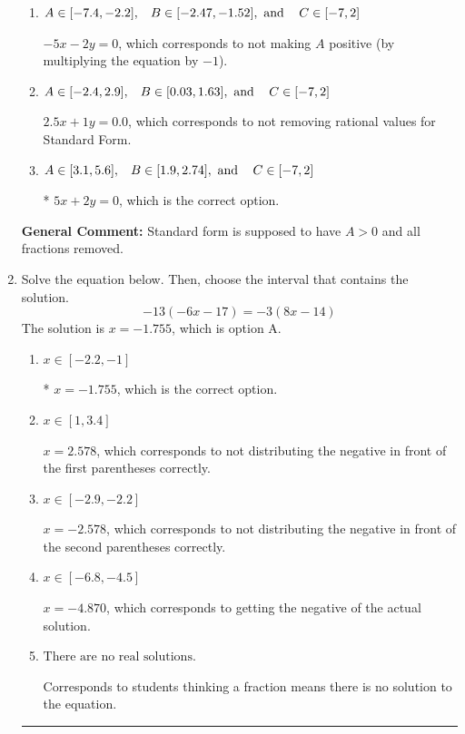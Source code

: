 \documentclass{extbook}[14pt]
\newcommand{\litem}[1]{\item #1

\rule{\textwidth}{0.4pt}}
\begin{document}
\begin{enumerate}
{\begin{enumerate}[label=\Alph*.]
 $5x - 2y = 0$, which corresponds to using the opposite (negative) slope of the graph, but did everything else correctly.
\item \( A \in [-7.4, -2.2], \hspace{3mm} B \in [-2.47, -1.52], \text{ and } \hspace{3mm} C \in [-7, 2] \)

 $-5x - 2y = 0$, which corresponds to not making $A$ positive (by multiplying the equation by $-1$).
\item \( A \in [-2.4, 2.9], \hspace{3mm} B \in [0.03, 1.63], \text{ and } \hspace{3mm} C \in [-7, 2] \)

 $2.5x + 1y = 0.0$, which corresponds to not removing rational values for Standard Form.
\item \( A \in [3.1, 5.6], \hspace{3mm} B \in [1.9, 2.74], \text{ and } \hspace{3mm} C \in [-7, 2] \)

* $5x + 2y = 0$, which is the correct option.
\end{enumerate}

\textbf{General Comment:} Standard form is supposed to have $A > 0$ and all fractions removed.
}
\litem{
Solve the equation below. Then, choose the interval that contains the solution.
\[ -13(-6x -17) = -3(8x -14) \]The solution is \( x = -1.755 \), which is option A.\begin{enumerate}[label=\Alph*.]
\item \( x \in [-2.2, -1] \)

* $x = -1.755$, which is the correct option.
\item \( x \in [1, 3.4] \)

$x = 2.578$, which corresponds to not distributing the negative in front of the first parentheses correctly.
\item \( x \in [-2.9, -2.2] \)

$x = -2.578$, which corresponds to not distributing the negative in front of the second parentheses correctly.
\item \( x \in [-6.8, -4.5] \)

$x = -4.870$, which corresponds to getting the negative of the actual solution.
\item \( \text{There are no real solutions.} \)

Corresponds to students thinking a fraction means there is no solution to the equation.
\end{enumerate}

}
\end{enumerate}
\end{document}
